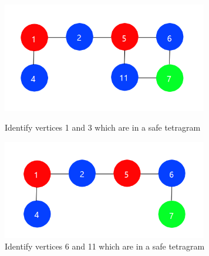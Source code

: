 \begin{figure}[htbp]
\centering
\begin{minipage}[t]{0.5\textwidth}
\centering
\includegraphics[width=0.8\textwidth]{figure/5.png}
\caption{\small Identify vertices 1 and 3 which are in a safe tetragram}
\end{minipage}
\begin{minipage}[t]{0.48\textwidth}
\centering
\includegraphics[width=0.8\textwidth]{figure/6.png}
\caption{\small Identify vertices 6 and 11 which are in a safe tetragram}
\end{minipage}
\end{figure}
